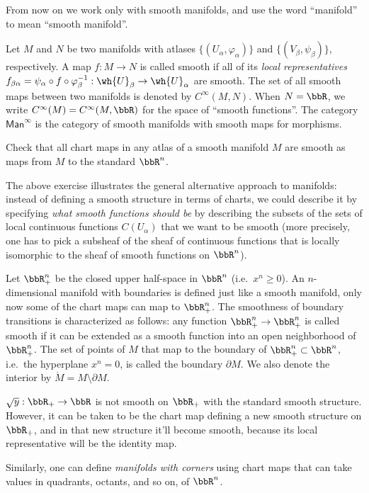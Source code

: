 From now on we work only with smooth manifolds, and use the word ``manifold''  to mean ``smooth manifold''.
\begin{defn}
Let $M$ and $N$ be two manifolds with atlases $\{(U_\alpha,\varphi_\alpha)\}$ and $\{(V_\beta,\psi_\beta)\}$, respectively. A map $f:M\to N$ is called smooth if all of its \emph{local representatives} $f_{\beta\alpha}=\psi_\alpha\circ f\circ \varphi_\beta^{-1}:\wh{U}_\beta\to \wh{U}_\alpha$ are smooth. The set of all smooth maps between two manifolds is denoted by $C^\infty (M,N)$. When $N=\bbR $, we write $C^\infty(M)=C^\infty (M,\bbR )$ for the space of ``smooth functions''. The category $\mathsf{Man}^\infty$ is the category of smooth manifolds with smooth maps for morphisms.
\end{defn}
\begin{xca}
Check that all chart maps in any atlas of a smooth manifold $M$ are smooth as maps from $M$ to the standard $\bbR^n$.
\end{xca}
\begin{rem}
The above exercise illustrates the general alternative approach to manifolds: instead of defining a smooth structure in terms of charts, we could describe it by specifying \emph{what smooth functions should be} by describing the subsets of the sets of local continuous functions $C(U_\alpha)$ that we want to be smooth (more precisely, one has to pick a subsheaf of the sheaf of continuous functions that is locally isomorphic to the sheaf of smooth functions on $\bbR^n$).
\end{rem}
\begin{defn}
Let $\bbR_+^n$ be the closed upper half-space in $\bbR^n$ (i.e.\ $x^n\geq 0$). An $n$-dimensional manifold with boundaries is defined just like a smooth manifold, only now some of the chart maps can map to $\bbR_+^n$. The smoothness of boundary transitions is characterized as follows: any function $\bbR_+^n\to \bbR_+^n$ is called smooth if it can be extended as a smooth function into an open neighborhood of $\bbR_+^n$. The set of points of $M$ that map to the boundary of $\bbR_+^n\subset \bbR^n$, i.e.\ the hyperplane $x^n=0$, is called the boundary $\partial M$. We also denote the interior by $\mathring M=M\setminus \partial M$.
\end{defn}
\begin{example}
$\sqrt{y}:\bbR_+\to\bbR $ is not smooth on $\bbR_+$ with the standard smooth structure. However, it can be taken to be the chart map defining a new smooth structure on $\bbR_+$, and in that new structure it'll become smooth, because its local representative will be the identity map.
\end{example}
\begin{rem}
Similarly, one can define \emph{manifolds with corners} using chart maps that can take values in quadrants, octants, and so on, of $\bbR^n$.
\end{rem}


